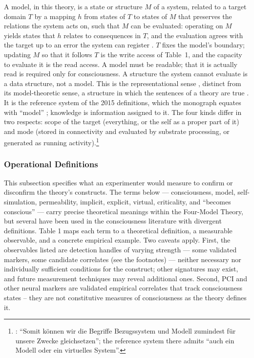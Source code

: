 \documentclass[12pt]{article}
\begin{document}
A model, in this theory, is a state or structure $M$ of a system, related to a target domain $T$ by a mapping $h$ from states of $T$ to states of $M$ that preserves the relations the system acts on, such that $M$ can be evaluated: operating on $M$ yields states that $h$ relates to consequences in $T$, and the evaluation agrees with the target up to an error the system can register \citep{Craik1943,ConantAshby1970}. $T$ fixes the model's boundary; updating $M$ so that it follows $T$ is the write access of Table~1, and the capacity to evaluate it is the read access. A model must be readable; that it is actually read is required only for consciousness. A structure the system cannot evaluate is a data structure, not a model. This is the representational sense \citep{FriggHartmann2025}, distinct from its model-theoretic sense, a structure in which the sentences of a theory are true \citep{Tarski1954}. It is the reference system of the 2015 definitions, which the monograph equates with ``model'' \citep[p.~22]{Gruber2015}; knowledge is information assigned to it. The four kinds differ in two respects: scope of the target (everything, or the self as a proper part of it) and mode (stored in connectivity and evaluated by substrate processing, or generated as running activity).\footnote{\citet[p.~22]{Gruber2015}: ``Somit k\"onnen wir die Begriffe Bezugssystem und Modell zumindest f\"ur unsere Zwecke gleichsetzen''; the reference system there admits ``auch ein Modell oder ein virtuelles System''.}

\subsubsection{Operational Definitions}

This subsection specifies what an experimenter would measure to confirm or disconfirm the theory's constructs. The terms below --- consciousness, model, self-simulation, permeability, implicit, explicit, virtual, criticality, and ``becomes conscious'' --- carry precise theoretical meanings within the Four-Model Theory, but several have been used in the consciousness literature with divergent definitions. Table 1 maps each term to a theoretical definition, a measurable observable, and a concrete empirical example. Two caveats apply. First, the observables listed are detection handles of varying strength — some validated markers, some candidate correlates (see the footnotes) — neither necessary nor individually sufficient conditions for the construct; other signatures may exist, and future measurement techniques may reveal additional ones. Second, PCI and other neural markers are validated empirical correlates that track consciousness states -- they are not constitutive measures of consciousness as the theory defines it.
\end{document}
